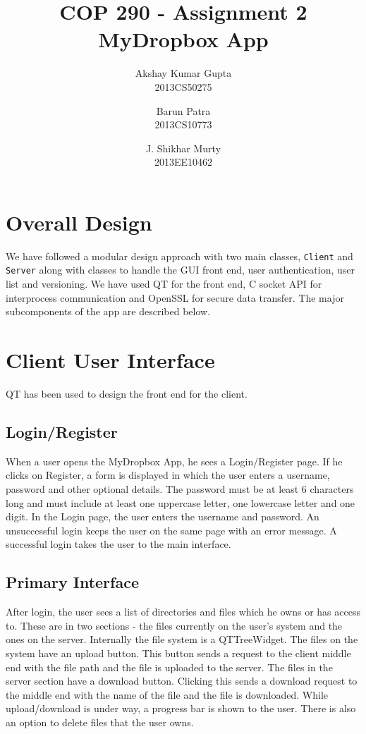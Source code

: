 \documentclass[]{article}
\newcommand{\ty}[1]{\texttt{#1}}
\begin{document}
\title{COP 290 - Assignment 2\\MyDropbox App}
\author{Akshay Kumar Gupta\\ 2013CS50275 \and  Barun Patra\\{2013CS10773} \and J. Shikhar Murty\\{2013EE10462}}
\date{}
\maketitle
\section{Overall Design}
We have followed a modular design approach with two main classes, \ty{Client} and \ty{Server} along with classes to handle the GUI front end, user authentication, user list and versioning. We have used QT for the front end, C socket API for interprocess communication and OpenSSL for secure data transfer. The major subcomponents of the app are described below.
\section{Client User Interface}
QT has been used to design the front end for the client.
\subsection{Login/Register}
When a user opens the MyDropbox App, he sees a Login/Register page. If he clicks on Register, a form is displayed in which the user enters a username, password and other optional details. The password must be at least 6 characters long and must include at least one uppercase letter, one lowercase letter and one digit. In the Login page, the user enters the username and password. An unsuccessful login keeps the user on the same page with an error message. A successful login takes the user to the main interface.
\subsection{Primary Interface}
After login, the user sees a list of directories and files which he owns or has access to. These are in two sections - the files currently on the user's system and the ones on the server. Internally the file system is a QTTreeWidget. The files on the system have an upload button. This button sends a request to the client middle end with the file path and the file is uploaded to the server. The files in the server section have a download button. Clicking this sends a download request to the middle end with the name of the file and the file is downloaded. While upload/download is under way, a progress bar is shown to the user. There is also an option to delete files that the user owns.
\end{document}
